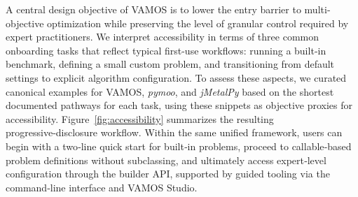 \documentclass[journal]{IEEEtran}
\newcommand{\VAMOS}{VAMOS}
\begin{document}
A central design objective of \VAMOS{} is to lower the entry barrier to multi-objective optimization while preserving the level of granular control required by expert practitioners. We interpret accessibility in terms of three common onboarding tasks that reflect typical first-use workflows: running a built‑in benchmark, defining a small custom problem, and transitioning from default settings to explicit algorithm configuration. To assess these aspects, we curated canonical examples for \VAMOS{}, \textit{pymoo}, and \textit{jMetalPy} based on the shortest documented pathways for each task, using these snippets as objective proxies for accessibility. Figure~\ref{fig:accessibility} summarizes the resulting progressive‑disclosure workflow. Within the same unified framework, users can begin with a two‑line quick start for built‑in problems, proceed to callable‑based problem definitions without subclassing, and ultimately access expert‑level configuration through the builder API, supported by guided tooling via the command‑line interface and \VAMOS{} Studio.

\end{document}

